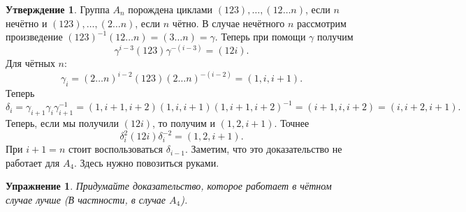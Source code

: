 \documentclass[10pt,a4paper,oneside]{book}
\newtheorem{uprz}{\color{violet!100!black} Упражнение}
\theoremstyle{definition}
\newtheorem{utvr}{\color{blue!50!black}Утверждение}
\def\utv{\begin{utvr}}
\def\eutv{\end{utvr}}
\def\upr{\begin{uprz}}
\def\eupr{\end{uprz}}
\begin{document}
\utv Группа $A_n$ порождена циклами $(123),\dots,(12\dots n)$, если $n$ нечётно  и  $(123),\dots,(2\dots n)$, если $n$ чётно.
\proof В случае нечётного $n$ рассмотрим произведение $(123)^{-1}(12\dots n)=(3\dots n )= \gamma$. Теперь при помощи $\gamma$ получим 
$$\gamma^{i-3}(123)\gamma^{-(i-3)}=(12i).$$
Для чётных $n$:
$$\gamma_i= (2\dots n)^{i-2} (123)(2\dots n)^{-(i-2)}=(1, i,i+1).$$
Теперь 
$$\delta_i=\gamma_{i+1}\gamma_i \gamma_{i+1}^{-1}= (1, i+1,i+2)(1, i,i+1)(1, i+1,i+2)^{-1}=(i+1,i,i+2)=(i,i+2,i+1).$$
Теперь, если мы получили $(12i)$, то получим и $(1,2, i+1)$. Точнее
$$\delta_i^2 (12i)\delta_i^{-2}=(1,2,i+1).$$
При $i+1=n$ стоит воспользоваться $\delta_{i-1}$. Заметим, что это доказательство не работает для $A_4$. Здесь нужно повозиться руками.
\endproof
\eutv


\upr Придумайте доказательство, которое работает в чётном случае лучше (В частности, в случае $A_4$).
\eupr





















\end{document}
